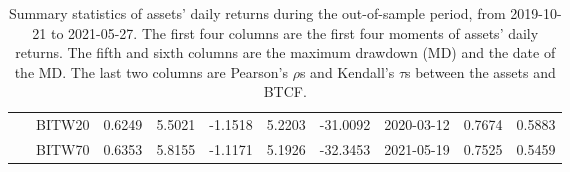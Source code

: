 \documentclass[11pt,a4paper,english]{article}
\begin{document}
{\begin{table}[th]
{\begin{tabular}{lrrrrrrrr}
\ \ \ BITW20  &  0.6249 &  5.5021 & -1.1518 &   5.2203 & -31.0092 &  2020-03-12 &  0.7674 &  0.5883 \\
\ \ \ BITW70  &  0.6353 &  5.8155 & -1.1171 &   5.1926 & -32.3453 &  2021-05-19 &  0.7525 &  0.5459 \\
\bottomrule
\end{tabular}}
\caption{Summary statistics of assets' daily returns during the out-of-sample period, from 2019-10-21 to 2021-05-27.
        The first four columns are the first four moments of assets' daily returns.
        The fifth and sixth columns are the maximum drawdown (MD) and the date of the MD.
        The last two columns are Pearson's $\rho$s and Kendall's $\tau$s between the assets and BTCF. }
\label{tab:SSA}

\end{table}
}
\end{document}
